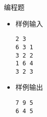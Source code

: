 \begin{frame}[fragile]
{\begin{exampleblock}{编程题}
\begin{itemize}
                \item 样例输入

                    \lstinline|2 3|\\
                    \lstinline|6 3 1|\\
                    \lstinline|3 2 2|\\
                    \lstinline|1 6 4|\\
                    \lstinline|3 2 3|

                \item 样例输出

                    \lstinline|7 9 5|\\
                    \lstinline|6 4 5|

            \end{itemize}

        \end{exampleblock}
    }
\end{frame}

